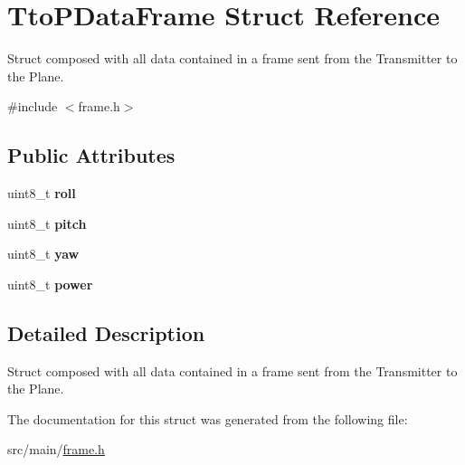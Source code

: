 \hypertarget{struct_tto_p_data_frame}{}\section{Tto\+P\+Data\+Frame Struct Reference}
\label{struct_tto_p_data_frame}


Struct composed with all data contained in a frame sent from the Transmitter to the Plane.  




{\ttfamily \#include $<$frame.\+h$>$}

\subsection*{Public Attributes}
\begin{DoxyCompactItemize}
\item 
\mbox{\label{struct_tto_p_data_frame_a3bbd087f4b60b7394a603ae3b6a97823}} 
uint8\+\_\+t {\bfseries roll}
\item 
\mbox{\label{struct_tto_p_data_frame_a97d0b21d8d48f84e459735aea087338c}} 
uint8\+\_\+t {\bfseries pitch}
\item 
\mbox{\label{struct_tto_p_data_frame_a006555f9f0b70c2253dd38ca78917a84}} 
uint8\+\_\+t {\bfseries yaw}
\item 
\mbox{\label{struct_tto_p_data_frame_a49a1f4d925f15a0de6244c5a89607089}} 
uint8\+\_\+t {\bfseries power}
\end{DoxyCompactItemize}


\subsection{Detailed Description}
Struct composed with all data contained in a frame sent from the Transmitter to the Plane. 

The documentation for this struct was generated from the following file\+:\begin{DoxyCompactItemize}
\item 
src/main/\hyperlink{frame_8h}{frame.\+h}\end{DoxyCompactItemize}
